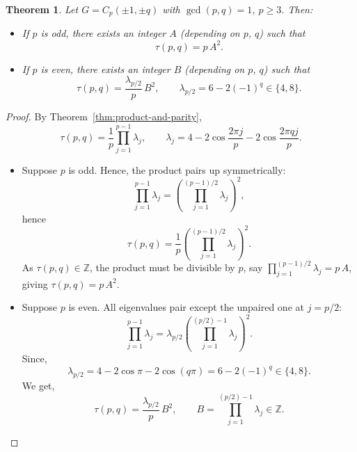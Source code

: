 \documentclass[10pt,a4paper]{amsart}
\newtheorem{theorem}{Theorem}
\begin{document}
\begin{theorem}\label{thm:square-shape}
Let $G=C_p(\pm 1,\pm q)$ with $\gcd(p,q)=1$, $p\ge3$. Then:
\begin{itemize}
\item[\emph{(a)}] If $p$ is odd, there exists an integer $A$ (depending on $p$, $q$) such that
\[
\tau(p,q)=p\,A^2.
\]
\item[\emph{(b)}] If $p$ is even, there exists an integer $B$ (depending on $p$, $q$) such that
\[
\tau(p,q)=\frac{\lambda_{p/2}}{p}\,B^2,
\qquad \lambda_{p/2}=6-2(-1)^q\in\{4,8\}.
\]
\end{itemize}
\end{theorem}

\begin{proof}
By Theorem~\ref{thm:product-and-parity},
\[
\tau(p,q)=\frac{1}{p}\prod_{j=1}^{p-1}\lambda_j,
\qquad 
\lambda_j=4-2\cos\frac{2\pi j}{p}-2\cos\frac{2\pi q j}{p}.
\]

\begin{itemize}
    \item[(a)] Suppose $p$ is odd. Hence, the product pairs up symmetrically:
\[
\prod_{j=1}^{p-1}\lambda_j=\left(\prod_{j=1}^{(p-1)/2}\lambda_j\right)^2,
\]
hence
\[
\tau(p,q)=\frac{1}{p}\left(\prod_{j=1}^{(p-1)/2}\lambda_j\right)^2.
\]
As $\tau(p,q)\in\mathbb{Z}$, the product must be divisible by $p$, say $\prod_{j=1}^{(p-1)/2}\lambda_j=p\,A$, giving $\tau(p,q)=p\,A^2$.

\item[(b)] Suppose $p$ is even. All eigenvalues pair except the unpaired one at $j=p/2$:
\[
\prod_{j=1}^{p-1}\lambda_j=\lambda_{p/2}\left(\prod_{j=1}^{(p/2)-1}\lambda_j\right)^2.
\]
Since,
\[
\lambda_{p/2}=4-2\cos\pi-2\cos(q\pi)=6-2(-1)^q\in\{4,8\}.
\]
We get,
\[
\tau(p,q)=\frac{\lambda_{p/2}}{p}\,B^2,
\qquad B=\prod_{j=1}^{(p/2)-1}\lambda_j \in\mathbb{Z}.
\]  
\end{itemize}
\end{proof}
\end{document}
